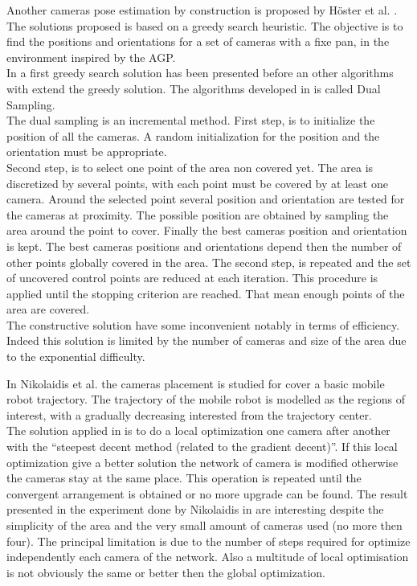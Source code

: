 Another cameras pose estimation by construction is proposed by Höster et al. \cite{171*horster2006}.
The solutions proposed is based on a greedy search heuristic. The objective is to find the positions and orientations for a set of cameras with a fixe pan, in the environment inspired by the AGP. \\
In \cite{171*horster2006} a first greedy search solution has been presented before an other algorithms with extend the greedy solution. The algorithms developed in \cite{171*horster2006} is called Dual Sampling.\\
The dual sampling is an incremental method. 
First step, is to initialize the position of all the cameras. A random initialization for the position and the orientation must be appropriate.  \\
Second step, is to select one point of the area non covered yet. The area is discretized by several points, with each point must be covered by at least one camera. Around the selected point several position and orientation are tested for the cameras at proximity. The possible position are obtained by sampling the area around the point to cover. Finally the best cameras position and orientation is kept. The best cameras positions and orientations depend then the number of other points globally covered in the area. 
The second step, is repeated and the set of uncovered control points are reduced at each iteration. This procedure is applied until the stopping criterion are reached. That mean enough points of the area are covered. \\
The constructive solution have some inconvenient notably in terms of efficiency. Indeed this solution is limited by the number of cameras and size of the area due to the exponential difficulty. %

In Nikolaidis et al. \cite{81*nikolaidis2009} the cameras placement is studied for cover a basic mobile robot trajectory.
The trajectory of the mobile robot is modelled as the regions of interest, with a gradually decreasing interested from the trajectory center.\\
  The solution applied in \cite{81*nikolaidis2009} is to do a local optimization one camera after another with the “steepest decent method (related to  the gradient decent)”. If this local optimization give a better solution the network of camera is modified otherwise the cameras stay at the same place. This operation is repeated until the convergent arrangement is obtained or no more upgrade can be found. The result presented in the experiment done by Nikolaidis in  \cite{81*nikolaidis2009} are interesting despite the simplicity of the area and the very small amount of cameras used (no more then four). The principal limitation is due to the number of steps required for optimize independently each camera of the network. Also a multitude of local optimisation is not obviously the same or better then the global optimization.

